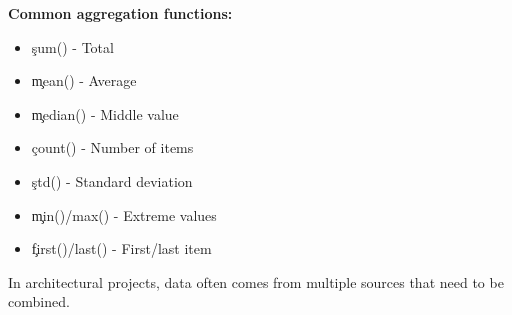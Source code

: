 \textbf{Common aggregation functions:}
\begin{itemize}
\item \c{sum()} - Total
\item \c{mean()} - Average
\item \c{median()} - Middle value
\item \c{count()} - Number of items
\item \c{std()} - Standard deviation
\item \c{min()/max()} - Extreme values
\item \c{first()/last()} - First/last item
\end{itemize}




In architectural projects, data often comes from multiple sources that need to be combined.

